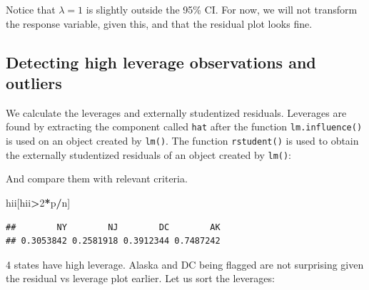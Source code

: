 \documentclass[
]{book}
\newenvironment{Shaded}{\begin{snugshade}}{\end{snugshade}}
\newcommand{\DecValTok}[1]{\textcolor[rgb]{0.00,0.00,0.81}{#1}}
\newcommand{\DocumentationTok}[1]{\textcolor[rgb]{0.56,0.35,0.01}{\textbf{\textit{#1}}}}
\newcommand{\FunctionTok}[1]{\textcolor[rgb]{0.13,0.29,0.53}{\textbf{#1}}}
\newcommand{\NormalTok}[1]{#1}
\newcommand{\OtherTok}[1]{\textcolor[rgb]{0.56,0.35,0.01}{#1}}
\newcommand{\SpecialCharTok}[1]{\textcolor[rgb]{0.81,0.36,0.00}{\textbf{#1}}}
\begin{document}
Notice that \(\lambda=1\) is slightly outside the 95\% CI. For now, we will not transform the response variable, given this, and that the residual plot looks fine.

\hypertarget{detecting-high-leverage-observations-and-outliers}{%
\subsection*{Detecting high leverage observations and outliers}\label{detecting-high-leverage-observations-and-outliers}}

We calculate the leverages and externally studentized residuals. Leverages are found by extracting the component called \texttt{hat} after the function \texttt{lm.influence()} is used on an object created by \texttt{lm()}. The function \texttt{rstudent()} is used to obtain the externally studentized residuals of an object created by \texttt{lm()}:

\begin{Shaded}
\end{Shaded}

And compare them with relevant criteria.

\begin{Shaded}
\begin{Highlighting}[]
\NormalTok{hii[hii}\SpecialCharTok{\textgreater{}}\DecValTok{2}\SpecialCharTok{*}\NormalTok{p}\SpecialCharTok{/}\NormalTok{n]}
\end{Highlighting}
\end{Shaded}

\begin{verbatim}
##        NY        NJ        DC        AK 
## 0.3053842 0.2581918 0.3912344 0.7487242
\end{verbatim}

4 states have high leverage. Alaska and DC being flagged are not surprising given the residual vs leverage plot earlier. Let us sort the leverages:
\end{document}
